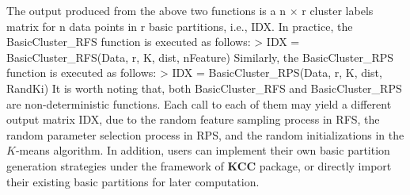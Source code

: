 \documentclass[acmsmall,screen,review]{acmart}
\begin{document}
The output produced from the above two functions is a \textsf{n} $\times$ \textsf{r} cluster labels matrix for \textsf{n} data points in \textsf{r} basic partitions, i.e., \textsf{IDX}. 
In practice, the \textsf{BasicCluster\_RFS} function is executed as follows:
\newline
\newline
\textsf{> IDX = BasicCluster\_RFS(Data, r, K, dist, nFeature)}
\newline
\newline
Similarly, the \textsf{BasicCluster\_RPS} function is executed as follows:
\newline
\newline
\textsf{> IDX = BasicCluster\_RPS(Data, r, K, dist, RandKi)}
\newline
\newline
It is worth noting that, both \textsf{BasicCluster\_RFS} and \textsf{BasicCluster\_RPS} are non-deterministic functions. Each call to each of them may yield a different output matrix IDX, due to the random feature sampling process in \textsf{RFS}, the random parameter selection process in \textsf{RPS}, and the random initializations in the $K$-means algorithm. In addition, users can implement their own basic partition generation strategies under the framework of \textbf{KCC} package, or directly import their existing basic partitions for later computation.
\end{document}
